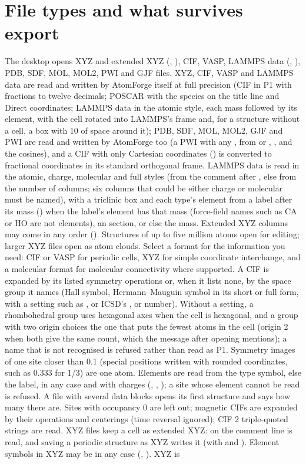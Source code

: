 \section{File types and what survives export}
The desktop opens XYZ and extended XYZ (, ), CIF, VASP, LAMMPS data (, ), PDB, SDF, MOL, MOL2, PWI and GJF files. XYZ, CIF, VASP and LAMMPS data are read and written by AtomForge itself at full precision (CIF in P1 with fractions to twelve decimals; POSCAR with the species on the title line and Direct coordinates; LAMMPS data in the atomic style, each mass followed by its element, with the cell rotated into LAMMPS's frame and, for a structure without a cell, a box with 10 \angstrom{} of space around it); PDB, SDF, MOL, MOL2, GJF and PWI are read and written by AtomForge too (a PWI with any , from  or , ,  and the cosines), and a CIF with only Cartesian coordinates () is converted to fractional coordinates in its standard orthogonal frame. LAMMPS data is read in the atomic, charge, molecular and full styles (from the comment after , else from the number of columns; six columns that could be either charge or molecular must be named), with a triclinic box and each type's element from a label after its mass () when the label's element has that mass (force-field names such as CA or HO are not elements), an  section, or else the mass. Extended XYZ columns may come in any order (). Structures of up to five million atoms open for editing; larger XYZ files open as atom clouds. Select a format for the information you need: CIF or VASP for periodic cells, XYZ for simple coordinate interchange, and a molecular format for molecular connectivity where supported. A CIF is expanded by its listed symmetry operations or, when it lists none, by the space group it names (Hall symbol, Hermann--Mauguin symbol in its short or full form, with a setting such as ,  or ICSD's , or number). Without a setting, a rhombohedral group uses hexagonal axes when the cell is hexagonal, and a group with two origin choices the one that puts the fewest atoms in the cell (origin 2 when both give the same count, which the message after opening mentions); a name that is not recognised is refused rather than read as P1. Symmetry images of one site closer than 0.1 \angstrom{} (special positions written with rounded coordinates, such as 0.333 for 1/3) are one atom. Elements are read from the type symbol, else the label, in any case and with charges (, , ); a site whose element cannot be read is refused. A file with several data blocks opens its first structure and says how many there are. Sites with occupancy 0 are left out; magnetic CIFs are expanded by their operations and centerings (time reversal ignored); CIF 2 triple-quoted strings are read. XYZ files keep a cell as extended XYZ:  on the comment line is read, and saving a periodic structure as XYZ writes it (with  and ). Element symbols in XYZ may be in any case (, ). XYZ is 